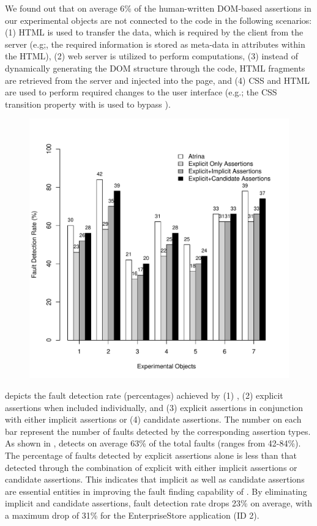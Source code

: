 We found out that on average 6\% of the human-written DOM-based assertions in our experimental objects are not connected to the \javascript code in the following scenarios: (1) HTML is used to transfer the data, which is required by the client from the server (e.g;, the required information is stored as meta-data in attributes within the HTML), (2) web server is utilized to perform computations, (3) instead of dynamically generating the DOM structure through the \javascript code, HTML fragments are retrieved from the server and injected into the page, and (4) CSS and HTML are used to perform required changes to the user interface (e.g.; the CSS transition property with  is used to bypass \javascript).

\begin{figure}[!t]
  \centering
  \includegraphics[width=0.8\hsize]{r-scripts/assertionTypeFaultDetec}
  \vspace{-0.18in} 
  \vspace{-0.3in} 
  \label{Fig:assertionTypeFaultDetec} 
\end{figure}

  depicts the fault detection rate (percentages) achieved by (1) \tool, (2) explicit assertions when included individually, and (3) explicit assertions in conjunction with either implicit assertions or (4) candidate assertions. The number on each bar represent the number of faults detected by the corresponding assertion types. As shown in , \tool detects on average 63\% of the total faults (ranges from 42-84\%).
The percentage of faults detected by explicit assertions alone is less than that detected through the combination of explicit with either implicit assertions or candidate assertions. This indicates that implicit as well as candidate assertions are essential entities in improving the fault finding capability of \tool. By eliminating implicit and candidate assertions, fault detection rate drops 23\% on average, with a maximum drop of 31\% for the EnterpriseStore application (ID 2).

